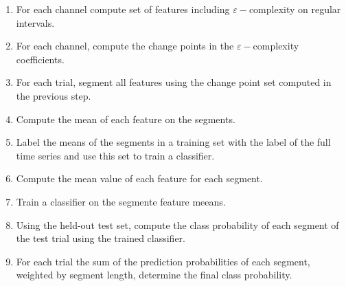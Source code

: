 
\begin{enumerate}
  \item For each channel compute set of features
        including $\varepsilon-$complexity
        on regular intervals.
  \item For each channel, compute the change points 
        in the $\varepsilon-$complexity coefficients. 
  \item For each trial, segment all features using the change point 
        set computed in the previous step. 
  \item Compute the mean of each feature on the 
        segments. 
   \item Label the means of the segments 
         in a training 
         set with the label of the full time 
         series and use this set to train 
         a classifier.
  \item Compute the mean value of each feature for each segment.
   \item Train a classifier on the segmente feature meeans.
  \item  Using the held-out test set, 
         compute the class probability of each 
       segment of the test trial using the trained 
         classifier. 
  \item  For each trial the sum of the prediction probabilities of each segment, weighted by segment length, determine the final class probability.
\end{enumerate} \label{alg:segment-alg}

